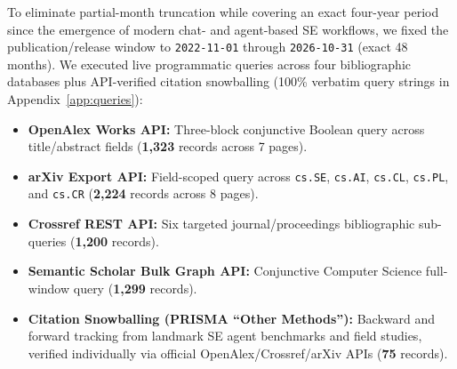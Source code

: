 \documentclass[10pt,twocolumn,a4paper]{article}
\begin{document}
To eliminate partial-month truncation while covering an exact four-year period since the emergence of modern chat- and agent-based SE workflows, we fixed the publication/release window to \texttt{2022-11-01} through \texttt{2026-10-31} (exact 48 months). We executed live programmatic queries across four bibliographic databases plus API-verified citation snowballing (100\% verbatim query strings in Appendix~\ref{app:queries}):
\begin{itemize}[leftmargin=*,nosep]
    \item \textbf{OpenAlex Works API:} Three-block conjunctive Boolean query across title/abstract fields (\textbf{1,323} records across 7 pages).
    \item \textbf{arXiv Export API:} Field-scoped query across \texttt{cs.SE}, \texttt{cs.AI}, \texttt{cs.CL}, \texttt{cs.PL}, and \texttt{cs.CR} (\textbf{2,224} records across 8 pages).
    \item \textbf{Crossref REST API:} Six targeted journal/proceedings bibliographic sub-queries (\textbf{1,200} records).
    \item \textbf{Semantic Scholar Bulk Graph API:} Conjunctive Computer Science full-window query (\textbf{1,299} records).
    \item \textbf{Citation Snowballing (PRISMA ``Other Methods''):} Backward and forward tracking from landmark SE agent benchmarks and field studies, verified individually via official OpenAlex/Crossref/arXiv APIs (\textbf{75} records).
\end{itemize}
\end{document}
